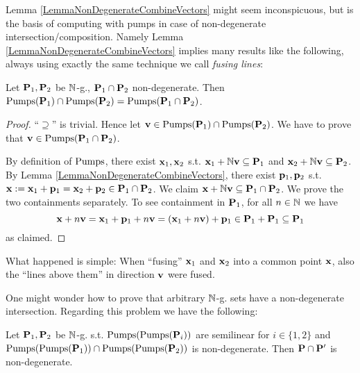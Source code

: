 Lemma \ref{LemmaNonDegenerateCombineVectors} might seem inconspicuous, but is the basis of computing with pumps in case of non-degenerate intersection/composition. Namely Lemma \ref{LemmaNonDegenerateCombineVectors} implies many results like the following, always using exactly the same technique we call \emph{fusing lines}:

\begin{lemma}
Let \(\mathbf{P}_1, \mathbf{P}_2\) be \(\mathbb{N}\)-g., \(\mathbf{P}_1 \cap \mathbf{P}_2\) non-degenerate. Then \(\operatorname{Pumps}(\mathbf{P}_1)\cap \operatorname{Pumps}(\mathbf{P}_2)=\operatorname{Pumps}(\mathbf{P}_1 \cap \mathbf{P}_2)\).
\end{lemma}

\begin{proof}
``\(\supseteq\)'' is trivial. Hence let \(\mathbf{v} \in \operatorname{Pumps}(\mathbf{P}_1)\cap \operatorname{Pumps}(\mathbf{P}_2)\). We have to prove that \(\mathbf{v} \in \operatorname{Pumps}(\mathbf{P}_1 \cap \mathbf{P}_2)\).

By definition of \(\operatorname{Pumps}\), there exist \(\mathbf{x}_1, \mathbf{x}_2\) s.t. \(\mathbf{x}_1+\mathbb{N} \mathbf{v} \subseteq \mathbf{P}_1\) and \(\mathbf{x}_2+\mathbb{N} \mathbf{v} \subseteq \mathbf{P}_2\). By Lemma \ref{LemmaNonDegenerateCombineVectors}, there exist \(\mathbf{p}_1, \mathbf{p}_2\) s.t. \(\mathbf{x}:=\mathbf{x}_1+\mathbf{p}_1=\mathbf{x}_2+\mathbf{p}_2 \in \mathbf{P}_1 \cap \mathbf{P}_2\). We claim \(\mathbf{x}+\mathbb{N} \mathbf{v} \subseteq \mathbf{P}_1 \cap \mathbf{P}_2\). We prove the two containments separately. To see containment in \(\mathbf{P}_1\), for all \(n\in \mathbb{N}\) we have \[\mathbf{x}+n \mathbf{v}=\mathbf{x}_1+\mathbf{p}_1+n\mathbf{v}=(\mathbf{x}_1+n \mathbf{v})+\mathbf{p}_1 \in \mathbf{P}_1+\mathbf{P}_1 \subseteq \mathbf{P}_1\]
as claimed.
\end{proof}

What happened is simple: When ``fusing'' \(\mathbf{x}_1\) and \(\mathbf{x}_2\) into a common point \(\mathbf{x}\), also the ``lines above them'' in direction \(\mathbf{v}\) were fused. 

One might wonder how to prove that arbitrary \(\mathbb{N}\)-g. sets have a non-degenerate intersection. Regarding this problem we have the following:

\begin{proposition} \label{PropositionNonDegenerateIntersection} \label{PropositionCheckNonDegenerate}
Let \(\mathbf{P}_1, \mathbf{P}_2\) be \(\mathbb{N}\)-g. s.t. \(\operatorname{Pumps}(\operatorname{Pumps}(\mathbf{P}_i))\) are semilinear for \(i \in \{1,2\}\) and \(\operatorname{Pumps}(\operatorname{Pumps}(\mathbf{P}_1)) \cap \operatorname{Pumps}(\operatorname{Pumps}(\mathbf{P}_2))\) is non-degenerate. Then \(\mathbf{P} \cap \mathbf{P}'\) is non-degenerate.
\end{proposition}

